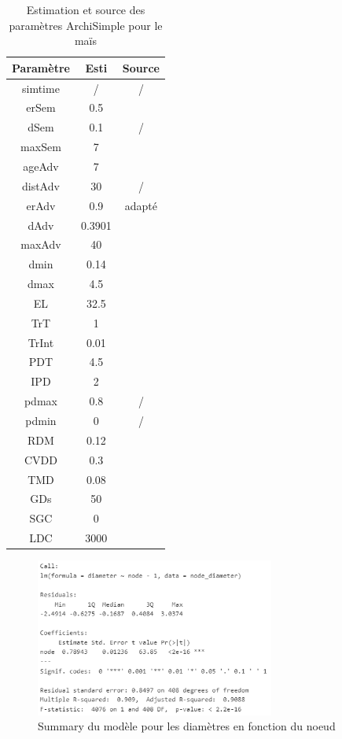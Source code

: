 \label{an:Maize}
\begin{table}[ht]
    \centering
    \caption{Estimation et source des paramètres ArchiSimple pour le maïs}
    \begin{tabular}{c c c}
        Paramètre & Esti & Source \\
        \hline
       simtime & / & / \\
       erSem & 0.5 & \cite{kumar_goyal_how_2021} \\
       dSem & 0.1 & / \cite{pace_analysis_2014} \\
       maxSem & 7 & \cite{kumar_goyal_how_2021} \\
       ageAdv & 7 & \cite{kumar_goyal_how_2021} \\
       distAdv & 30 & / \\
       erAdv & 0.9 & \cite{pages_calibration_2014} adapté \\
       dAdv & 0.3901 & \cite{noauthor_global_2023} \\
       maxAdv & 40 & \cite{pages_calibration_2014} \\
       dmin & 0.14 & \cite{pages_calibration_2014} \\
       dmax & 4.5 & \cite{vanhees_root_2020} \\
       EL & 32.5 & \cite{cahn_relationship_1989} \\
       TrT & 1 & \cite{pages_calibration_2014} \\
       TrInt & 0.01 & \cite{pages_calibration_2014} \\
       PDT & 4.5 & \cite{gerard_modelling_2017} \\
       IPD & 2 & \cite{pages_calibration_2014} \\
       pdmax & 0.8 & / \\
       pdmin & 0 & / \\
       RDM & 0.12 & \cite{pages_calibration_2014} \\
       CVDD & 0.3 & \cite{pages_calibration_2014} \\
       TMD & 0.08 & \cite{pages_calibration_2014} \\
       GDs & 50 & \cite{pages_calibration_2014} \\
       SGC & 0 & \cite{pages_calibration_2014} \\
       LDC & 3000 & \cite{pages_calibration_2014}
    \end{tabular}
\end{table}

\newpage

\label{an:node_dia}
\begin{figure}[ht]
\centering
\includegraphics[width=0.7\textwidth]{Image/summary node_dia.png}
\caption{Summary du modèle pour les diamètres en fonction du noeud}
\end{figure}